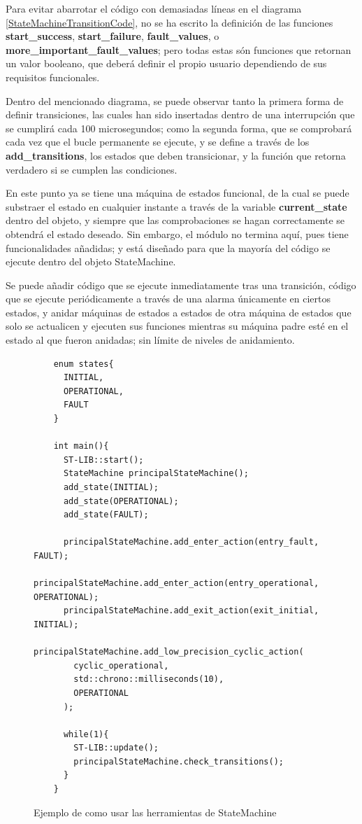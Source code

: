 \documentclass{report}
\begin{document}
Para evitar abarrotar el código con demasiadas líneas en el diagrama \ref{StateMachineTransitionCode}, no se ha escrito la definición de las funciones \textbf{start\_success}, \textbf{start\_failure}, \textbf{fault\_values}, o \textbf{more\_important\_fault\_values}; pero todas estas són funciones que retornan un valor booleano, que deberá definir el propio usuario dependiendo de sus requisitos funcionales. \par
Dentro del mencionado diagrama, se puede observar tanto la primera forma de definir transiciones, las cuales han sido insertadas dentro de una interrupción que se cumplirá cada 100 microsegundos; como la segunda forma, que se comprobará cada vez que el bucle permanente se ejecute, y se define a través de los \textbf{add\_transitions}, los estados que deben transicionar, y la función que retorna verdadero si se cumplen las condiciones. 
\par \vspace{0.3cm}
En este punto ya se tiene una máquina de estados funcional, de la cual se puede substraer el estado en cualquier instante a través de la variable \textbf{current\_state} dentro del objeto, y siempre que las comprobaciones se hagan correctamente se obtendrá el estado deseado. Sin embargo, el módulo no termina aquí, pues tiene funcionalidades añadidas; y está diseñado para que la mayoría del código se ejecute dentro del objeto StateMachine. 
\par \vspace{0.3cm}
Se puede añadir código que se ejecute inmediatamente tras una transición, código que se ejecute periódicamente a través de una alarma únicamente en ciertos estados, y anidar máquinas de estados a estados de otra máquina de estados que solo se actualicen y ejecuten sus funciones mientras su máquina padre esté en el estado al que fueron anidadas; sin límite de niveles de anidamiento. 
\begin{figure}[h]
  \begin{lstlisting}
    enum states{
      INITIAL,
      OPERATIONAL,
      FAULT
    }

    int main(){
      ST-LIB::start();
      StateMachine principalStateMachine();
      add_state(INITIAL);
      add_state(OPERATIONAL);
      add_state(FAULT);

      principalStateMachine.add_enter_action(entry_fault, FAULT);
      principalStateMachine.add_enter_action(entry_operational, OPERATIONAL);
      principalStateMachine.add_exit_action(exit_initial, INITIAL);
      principalStateMachine.add_low_precision_cyclic_action(
        cyclic_operational, 
        std::chrono::milliseconds(10),
        OPERATIONAL
      );

      while(1){
        ST-LIB::update();
        principalStateMachine.check_transitions();
      }
    }
  \end{lstlisting}
  \caption{Ejemplo de como usar las herramientas de StateMachine}
  \label{StateMachineUtilitiesCode}
\end{figure}
\par \vspace{0.3cm}
\end{document}
